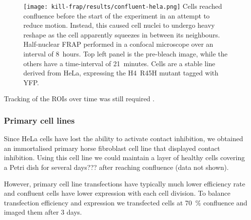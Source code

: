       \begin{figure}
        \centering
        \texttt{[image: kill-frap/results/confluent-hela.png]}
          {
            Cells reached confluence before the start of the
            experiment in an attempt to reduce motion. Instead, this caused
            cell nuclei to undergo heavy reshape as the cell apparently
            squeezes in between its neighbours. Half-nuclear FRAP performed in
            a confocal microscope over an interval of 8~hours. Top left panel
            is the pre-bleach image, while the others have a time-interval of
            21~minutes. Cells are a stable line derived from HeLa, expressing
            the H4~R45H mutant tagged with YFP.
          }
        \label{fig:kill-frap:confluent-hela}
      \end{figure}

      Tracking of the ROIs over time was still required .

    \subsubsection{Primary cell lines}

      Since HeLa cells have lost the ability to activate contact inhibition,
      we obtained an immortalised primary horse fibroblast cell line
      that displayed contact inhibition. Using this cell line we could
      maintain a layer of healthy cells covering a Petri dish for several days???
      after reaching confluence (data not shown).

      However, primary cell line transfections have typically much lower efficiency rate and
      confluent cells have lower expression with each cell division.
      To balance transfection efficiency and expression we transfected cells at
      \SI{70}{\percent} confluence and imaged them after 3 days.

